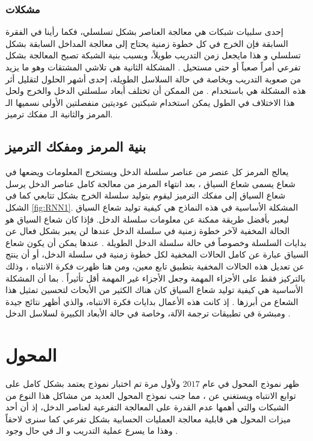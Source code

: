 \subsubsection{مشكلات 
}
إحدى سلبيات شبكات
 هي معالجة العناصر بشكل تسلسلي، فكما رأينا في الفقرة السابقة فإن الخرج في كل خطوة زمنية يحتاج إلى معالجة المداخل السابقة بشكل تسلسلي و هذا مايجعل زمن التدريب طويلاً، وبسبب بنية الشبكة تصبح المعالجة بشكل تفرعي أمراً صعباً أو حتى مستحيل
.
المشكلة الثانية هي تلاشي المشتقات
وهو ما يزيد من صعوبة التدريب وبخاصة في حالة السلاسل الطويلة، إحدى أشهر الحلول لتقليل أثر هذه المشكلة هي باستخدام
.
من الممكن أن تختلف أبعاد سلسلتي الدخل والخرج ولحل هذا الاختلاف في الطول يمكن استخدام شبكتين عوديتين منفصلتين الأولى نسميها الـ
المرمز والثانية الـ
مفكك ترميز.
\subsection{
بنية المرمز ومفكك الترميز
}
يعالج المرمز كل عنصر من عناصر سلسلة الدخل ويستخرج المعلومات ويضعها في شعاع يسمى شعاع السياق
،
بعد انتهاء المرمز من معالجة كامل عناصر الدخل يرسل شعاع السياق إلى مفكك الترميز
 ليقوم بتوليد سلسلة الخرج بشكل تتابعي كما في الشكل
\ref{fig:RNN1}.
\newline
المشكلة الأساسية في هذه النماذج هي كيفية توليد شعاع السياق ليعبر بأفضل طريقة ممكنة عن معلومات سلسلة الدخل. فإذا كان شعاع السياق هو الحالة المخفية لآخر خطوة زمنية في سلسلة الدخل عندها لن يعبر بشكل فعال عن بدايات السلسلة وخصوصاً في حالة سلسلة الدخل الطويلة
.
عندها يمكن أن يكون شعاع السياق عبارة عن كامل الحالات المخفية لكل خطوة زمنية في سلسلة الدخل، أو أن ينتج عن تعديل هذه الحالات المخفية بتطبيق تابع معين، ومن هنا ظهرت فكرة الانتباه 
،
وذلك بالتركيز فقط على الأجزاء المهمة وجعل الأجزاء غير المهمة أقل تأثيراً
.
بما أن المشكلة الأساسية هي كيفية توليد شعاع السياق كان هناك الكثير من الأبحاث لتحسين تمثيل هذا الشعاع من أبرزها
.
إذ كانت هذه الأعمال بدايات فكرة الانتباه، والذي أظهر نتائج جيدة ومبشرة في تطبيقات ترجمة الآلة، وخاصة في حالة الأبعاد الكبيرة لسلاسل الدخل
.

\section{المحول \label{section:transformer}}
ظهر نموذج المحول
في عام $2017$ ولأول مرة تم اختبار نموذج يعتمد بشكل كامل على توابع الانتباه ويستغني عن
،
 مما جنب نموذج المحول العديد من مشاكل هذا النوع من الشبكات والتي أهمها عدم القدرة على المعالجة التفرعية لعناصر الدخل، إذ أن أحد ميزات المحول هي قابلية معالجة العمليات الحسابية بشكل تفرعي كما سنرى لاحقاً وهذا ما يسرع عملية التدريب و الـ 
في حال وجود
.
